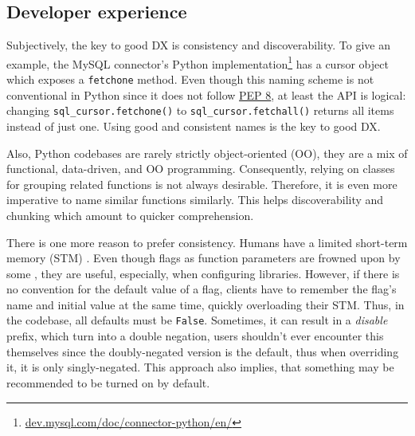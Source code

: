 \subsection{Developer experience}

Subjectively, the key to good DX is consistency and discoverability. To give an example, the MySQL connector's Python implementation\footnote{\href{https://dev.mysql.com/doc/connector-python/en/}{dev.mysql.com/doc/connector-python/en/}} has a cursor object which exposes a \texttt{fetchone} method. Even though this naming scheme is not conventional in Python since it does not follow \href{https://peps.python.org/pep-0008/}{PEP 8}, at least the API is logical: changing \texttt{sql\_cursor.fetchone()} to \texttt{sql\_cursor.fetchall()} returns all items instead of just one. Using good and consistent names is the key to good DX.

Also, Python codebases are rarely strictly object-oriented (OO), they are a mix of functional, data-driven, and OO programming. Consequently, relying on classes for grouping related functions is not always desirable. Therefore, it is even more imperative to name similar functions similarly. This helps discoverability and chunking \cite{hermans2021programmer} which amount to quicker comprehension.

There is one more reason to prefer consistency. Humans have a limited short-term memory (STM) \cite{miller1956magical}. Even though flags as function parameters are frowned upon by some \cite{martin2009clean}, they are useful, especially, when configuring libraries. However, if there is no convention for the default value of a flag, clients have to remember the flag's name and initial value at the same time, quickly overloading their STM. Thus, in the codebase, all defaults must be \texttt{False}. Sometimes, it can result in a \textit{disable} prefix, which turn into a double negation, users shouldn't ever encounter this themselves since the doubly-negated version is the default, thus when overriding it, it is only singly-negated. This approach also implies, that something may be recommended to be turned on by default.

